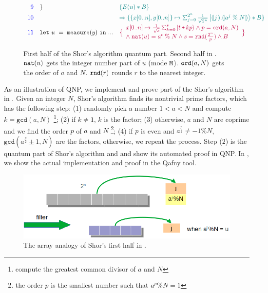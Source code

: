 \begin{figure}[t]
{\[\begin{array}{r l  l}
{}
\\[0.4em]
\textcolor{blue}{9}
&
\}
&
\textcolor{teal}{
\{E(n) * B \}
}
\\[0.4em]
\textcolor{blue}{10}
&
&
\textcolor{teal}{
\Rightarrow
\{\{x[0..n],y[0..n]\} \mapsto \sch{2^{n}}{\frac{1}{\sqrt{2^{n}}}}{\tos{j}.\tos{a^{j}\;\%\;N}} * B \}
}
\\[0.4em]
\textcolor{blue}{11}
& \sexp{u}{\smea{y}}{...}
&
\textcolor{purple}{
\big{\{}
\begin{array}{l}
x[0..n] \mapsto \smch{\frac{1}{\sqrt{s}}}{s}{t\,\splus\,k p} 
\wedge
p = \texttt{ord}(a,N)
\\
\wedge\;
\texttt{nat}(u)=a^{t}\;\%\;N
\wedge
s=\texttt{rnd}(\frac{2^n}{p}) \wedge B
\end{array}
\big{\}}
}
\end{array}
\]
}
\caption{First half of the Shor's algorithm quantum part. Second half in . $\texttt{nat}({u})$ gets the integer number part of $u$ (mode $\texttt{M}$). $\texttt{ord}({a,N})$ gets the order of $a$ and $N$. $\texttt{rnd}({r})$ rounds $r$ to the nearest integer. }
\label{fig:shorqafny}
\end{figure}

As an illustration of QNP, we implement and prove part of the Shor's algorithm in .
Given an integer $N$, Shor's algorithm finds its nontrivial prime factors, which has the following step: (1) randomly pick a number $1 < a < N$ and compute $k=\texttt{gcd}(a,N)$ \footnote{compute the greatest common divisor of $a$ and $N$}; (2) if $k \neq 1$, $k$ is the factor; (3) otherwise, $a$ and $N$ are coprime and we find the order $p$ of $a$ and $N$ \footnote{the order $p$ is the smallest number such that $a^p \% N = 1$}; (4) if $p$ is even and $a^{\frac{p}{2}} \neq -1 \% N$, $\texttt{gcd}(a^{\frac{p}{2}}\pm 1,N)$ are the factors, otherwise, we repeat the process. Step (2) is the quantum part of Shor's algorithm and  and  show its automated proof in QNP. In , we show the actual implementation and proof in the Qafny tool.

\begin{figure}
  \includegraphics[width=.60\textwidth]{shorsmap}
  \caption{The array analogy of Shor's first half in . }
\label{fig:shorsanalog}
\end{figure}


